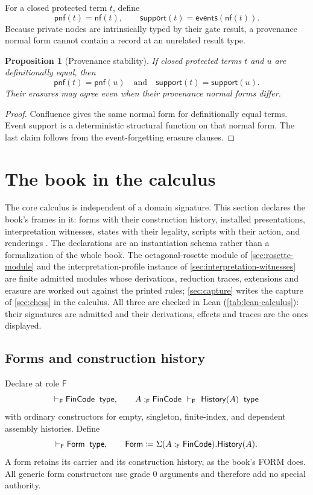 \documentclass[11pt]{article}
\numberwithin{equation}{section}
\theoremstyle{definition}
\theoremstyle{plain}
\newtheorem{proposition}[definition]{Proposition}
\theoremstyle{remark}
\renewcommand{\Form}{\AFForm}
\newcommand{\Hist}{\AFHistory}
\newcommand{\Frm}{\mathsf F}
\newcommand{\FORM}{\textsf{FORM}}
\newcommand{\events}{\mathsf{events}}
\newcommand{\nf}{\mathsf{nf}}
\newcommand{\jtype}{\mathrel{\mathsf{type}}}
\begin{document}
For a closed protected term \(t\), define
\[
  \mathsf{pnf}(t)=\nf(t),
  \qquad
  \mathsf{support}(t)=\events(\nf(t)).
\]
Because private nodes are intrinsically typed by their gate result, a
provenance normal form cannot contain a record at an unrelated result type.

\begin{proposition}[Provenance stability]\label{prop:prov}
If closed protected terms \(t\) and \(u\) are definitionally equal, then
\[
 \mathsf{pnf}(t)=\mathsf{pnf}(u)
 \quad\text{and}\quad
 \mathsf{support}(t)=\mathsf{support}(u).
\]
Their erasures may agree even when their provenance normal forms differ.
\end{proposition}

\begin{proof}
Confluence gives the same normal form for definitionally equal terms.  Event
support is a deterministic structural function on that normal form.  The last
claim follows from the event-forgetting erasure clauses.
\end{proof}

\section{The book in the calculus}\label{sec:artforms}

The core calculus is independent of a domain signature.  This section
declares the book's frames in it: forms with their construction history,
installed presentations, interpretation witnesses, states with their
legality, scripts with their action, and renderings \cite{Book}.  The
declarations are an instantiation schema rather than a formalization of the
whole book.  The octagonal-rosette module of \cref{sec:rosette-module} and the
interpretation-profile instance of \cref{sec:interpretation-witnesses} are
finite admitted modules whose derivations, reduction traces, extensions and
erasure are worked out against the printed rules; \cref{sec:capture} writes
the capture of \cref{sec:chess} in the calculus.  All three are checked in
Lean (\cref{tab:lean-calculus}): their signatures are admitted and their
derivations, effects and traces are the ones displayed.

\subsection{Forms and construction history}\label{sec:forms-calculus}

Declare at role \(\Frm\)
\[
 \vdash_{\Frm}\AFFinCode\;\jtype,
 \qquad
 A:_{\Frm}\AFFinCode\ \vdash_{\Frm}\ \Hist(A)\;\jtype
\]
with ordinary constructors for empty, singleton, finite-index, and dependent
assembly histories.  Define
\[
  \vdash_{\Frm}\Form\;\jtype,
  \qquad
  \Form\coloneqq\AFDepPair(A:_{\Frm}\AFFinCode).\Hist(A).
\]
A form retains its carrier and its construction history, as the book's
\FORM{} does.  All generic form constructors use grade \(0\) arguments and
therefore add no special authority.
\end{document}
